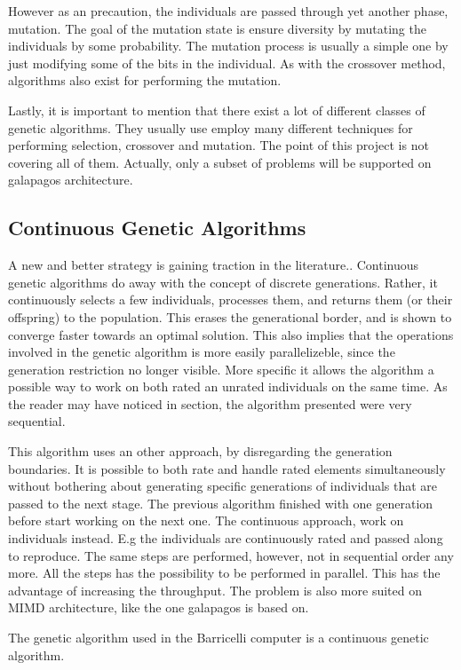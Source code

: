 However as an precaution, the individuals are passed through yet another phase, mutation. The goal of the mutation state is ensure diversity by mutating the individuals by some probability. The mutation process is usually a simple one by just modifying some of the bits in the individual. As with the crossover method, algorithms also exist for performing the mutation. 

Lastly, it is important to mention that there exist a lot of different classes of genetic algorithms. They usually use employ many different techniques for performing selection, crossover and mutation. The point of this project is not covering all of them. Actually, only a subset of problems will be supported on galapagos architecture. 




\subsection{Continuous Genetic Algorithms}

A new and better strategy is gaining traction in the literature..
Continuous genetic algorithms do away with the concept of discrete generations.
Rather, it continuously selects a few individuals, processes them, and returns them (or their offspring) to the population.
This erases the generational border, and is shown  to converge faster towards an optimal solution. This also implies that the operations involved in the genetic algorithm is  more easily parallelizeble, since the generation restriction no longer visible. More specific it allows the algorithm a possible way to work on both rated an unrated individuals on the same time. As the reader may have noticed in section, the algorithm presented were very sequential. 

This algorithm uses an other approach, by disregarding the generation boundaries. It is possible to both rate and handle rated elements simultaneously without bothering about generating specific generations of individuals that are passed to the next stage. The previous algorithm finished with one generation before start working on the next one. The continuous approach, work on individuals instead. E.g the individuals are continuously rated and passed along to reproduce. The same steps are performed, however, not in sequential order any more. All the steps has the possibility to be performed in parallel. This has the advantage of increasing the throughput. The problem is also more suited on MIMD architecture, like the one galapagos is based on.      





The genetic algorithm used in the Barricelli computer is a continuous genetic algorithm.


